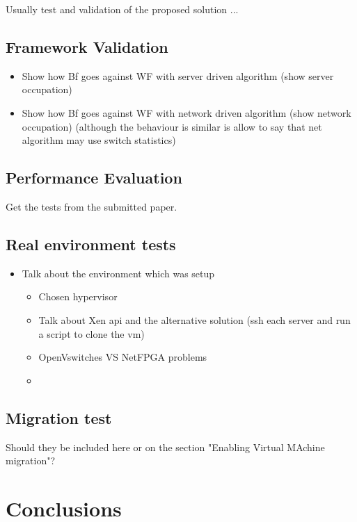 \documentclass[12pt,english]{book}
\begin{document}
Usually test and validation of the proposed solution ...

\section{Framework Validation}

\begin{itemize}
	\item Show how Bf goes against WF with server driven algorithm (show server occupation)
	\item Show how Bf goes against WF with network driven algorithm (show network occupation) (although the behaviour is similar is allow to say that net algorithm may use switch statistics)
\end{itemize}

\section{Performance Evaluation}

Get the tests from the submitted paper.

\section{Real environment tests}

\begin{itemize}
	\item Talk about the environment which was setup
	\begin{itemize}
		\item Chosen hypervisor
		\item Talk about Xen api and the alternative solution (ssh each server and run a script to clone the vm)
		\item OpenVswitches VS NetFPGA problems
		\item 
	\end{itemize}
\end{itemize}


\section{Migration test}

Should they be included here or on the section "Enabling Virtual MAchine migration"?

\chapter{Conclusions\label{cha:conclusions}}
\end{document}
